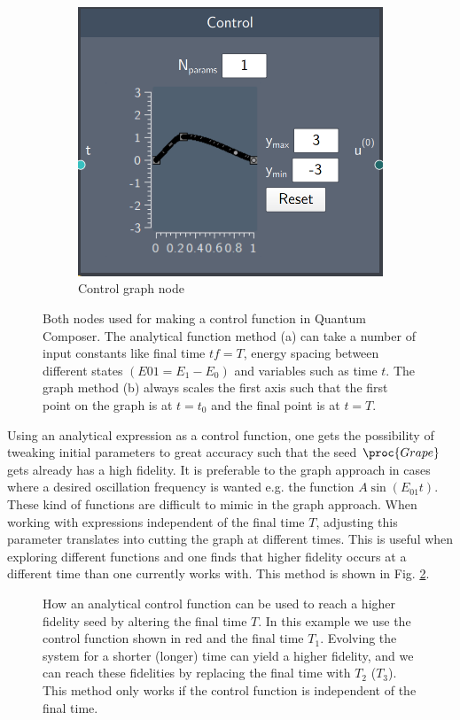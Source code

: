 \documentclass[a4paper, twocolumn]{revtex4-1}
\begin{document}
\begin{figure}[h]
\begin{subfigure}[b]{0.45\columnwidth}
		\includegraphics[width=\columnwidth]{graphics/composerScreens/ControlNode.png}
		\caption{Control graph node}
	\end{subfigure}
	\caption{Both nodes used for making a control function in Quantum Composer. The analytical function method (a) can take a number of input constants like final time $tf = T$, energy spacing between different states $(E01 = E_1 - E_0)$ and variables such as time $t$. The graph method (b) always scales the first axis such that the first point on the graph is at $t=t_0$ and the final point is at $t=T$.}
	\label{fig:Controls}
\end{figure}

Using an analytical expression as a control function, one gets the possibility of tweaking initial parameters to great accuracy such that the seed $\proc{Grape}$ gets already has a high fidelity. It is preferable to the graph approach in cases where a desired oscillation frequency is wanted e.g. the function $A\sin(E_{01}t)$. These kind of functions are difficult to mimic in the graph approach. When working with expressions independent of the final time $T$, adjusting this parameter translates into cutting the graph at different times. This is useful when exploring different functions and one finds that higher fidelity occurs at a different time than one currently works with. This method is shown in Fig. \ref{fig:funcAppr}. \\
\begin{figure}
	\def\svgwidth{\columnwidth}
	
	\caption{How an analytical control function can be used to reach a higher fidelity seed by altering the final time $T$. In this example we use the control function shown in red and the final time $T_1$. Evolving the system for a shorter (longer) time can yield a higher fidelity, and we can reach these fidelities by replacing the final time with $T_2$ ($T_3$). This method only works if the control function is independent of the final time.}
	\label{fig:funcAppr}
\end{figure}
\end{document}
